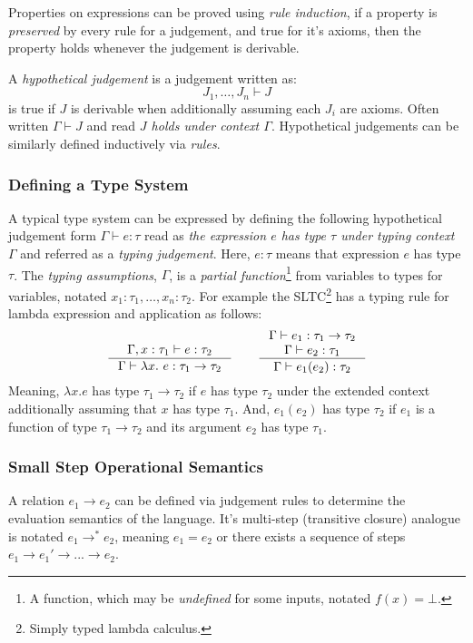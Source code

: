 Properties on expressions can be proved using \textit{rule induction}, if a property is \textit{preserved} by every rule for a judgement, and true for it's axioms, then the property holds whenever the judgement is derivable.

A \textit{hypothetical judgement} is a judgement written as: 
\[J_1, \dots, J_n \vdash J\]
is true if $J$ is derivable when additionally assuming each $J_i$ are axioms. Often written $\Gamma \vdash J$ and read \textit{$J$ holds under context $\Gamma$}. Hypothetical judgements can be similarly defined inductively via \textit{rules}.

\subsubsection{Defining a Type System}\label{sec:TypingJudgements}
A typical type system can be expressed by defining the following hypothetical judgement form $\Gamma \vdash e : \tau$ read as \textit{the expression $e$ has type $\tau$ under typing context $\Gamma$} and referred as a \textit{typing judgement}. Here, $e : \tau$ means that expression $e$ has type $\tau$.  The \textit{typing assumptions}, $\Gamma$, is a \textit{partial function}\footnote{A function, which may be \textit{undefined} for some inputs, notated $f(x) = \bot$.} \cite{PartialFunctions} from variables to types for variables, notated $x_1 : \tau_1, \dots, x_n : \tau_2$. For example the SLTC\footnote{Simply typed lambda calculus.} \cite[ch. 9]{TAPL} has a typing rule for lambda expression and application as follows:
\[\inference{\Gamma, x : \tau_1 \vdash e : \tau_2}{\Gamma \vdash \lambda x.\ e : \tau_1 \to \tau_2} \qquad \inference{\Gamma \vdash e_1 : \tau_1 \to \tau_2\\ \Gamma \vdash e_2 : \tau_1}{\Gamma \vdash e_1(e_2) : \tau_2}\]
Meaning, $\lambda x. e$ has type $\tau_1 \to \tau_2$ if $e$ has type $\tau_2$ under the extended context additionally assuming that $x$ has type $\tau_1$.
And, $e_1(e_2)$ has type $\tau_2$ if $e_1$ is a function of type $\tau_1 \to \tau_2$ and its argument $e_2$ has type $\tau_1$.

\subsubsection{Small Step Operational Semantics}
A relation $e_1 \to e_2$ can be defined via judgement rules to determine the evaluation semantics of the language. It's multi-step (transitive closure) analogue is notated $e_1 \to^{*} e_2$, meaning $e_1 = e_2$ or there exists a sequence of steps $e_1 \to e_1' \to ... \to e_2$.

